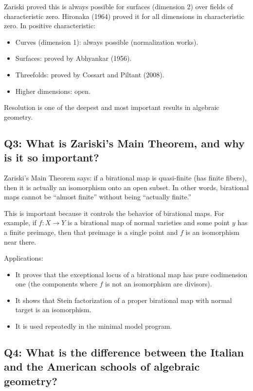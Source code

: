 Zariski proved this is always possible for surfaces (dimension 2) over fields of characteristic zero. Hironaka (1964) proved it for all dimensions in characteristic zero. In positive characteristic:
\begin{itemize}
    \item Curves (dimension 1): always possible (normalization works).
    \item Surfaces: proved by Abhyankar (1956).
    \item Threefolds: proved by Cossart and Piltant (2008).
    \item Higher dimensions: open.
\end{itemize}

Resolution is one of the deepest and most important results in algebraic geometry.

\subsection*{Q3: What is Zariski's Main Theorem, and why is it so important?}

Zariski's Main Theorem says: if a birational map is quasi-finite (has finite fibers), then it is actually an isomorphism onto an open subset. In other words, birational maps cannot be ``almost finite'' without being ``actually finite.''

This is important because it controls the behavior of birational maps. For example, if $f: X \to Y$ is a birational map of normal varieties and some point $y$ has a finite preimage, then that preimage is a single point and $f$ is an isomorphism near there.

Applications:
\begin{itemize}
    \item It proves that the exceptional locus of a birational map has pure codimension one (the components where $f$ is not an isomorphism are divisors).
    \item It shows that Stein factorization of a proper birational map with normal target is an isomorphism.
    \item It is used repeatedly in the minimal model program.
\end{itemize}

\subsection*{Q4: What is the difference between the Italian and the American schools of algebraic geometry?}

